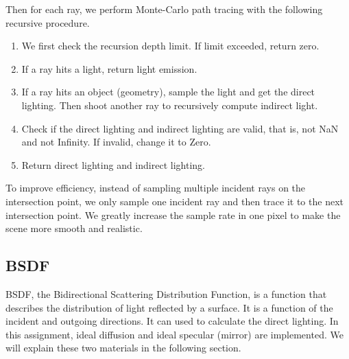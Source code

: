\documentclass[acmtog]{acmart}
\begin{document}
Then for each ray, we perform Monte-Carlo path tracing with the following recursive procedure. 

\begin{enumerate}
	\item We first check the recursion depth limit. If limit exceeded, return zero.
	\item If a ray hits a light, return light emission.
	\item If a ray hits an object (geometry), sample the light and get the direct lighting. Then shoot another ray to recursively compute indirect light.
	\item Check if the direct lighting and indirect lighting are valid, that is, not NaN and not Infinity. If invalid, change it to Zero.
	\item Return direct lighting and indirect lighting. 
\end{enumerate}


To improve efficiency, instead of sampling multiple incident rays on the intersection point, we only sample one incident ray and then trace it to the next intersection point. We greatly increase the sample rate in one pixel to make the scene more smooth and realistic. 




\subsection{BSDF}

BSDF, the Bidirectional Scattering Distribution Function, is a function that describes the distribution of light reflected by a surface. It is a function of the incident and outgoing directions. It can used to calculate the direct lighting. In this assignment, ideal diffusion and ideal specular (mirror) are implemented. We will explain these two materials in the following section.

\newpage
\end{document}

